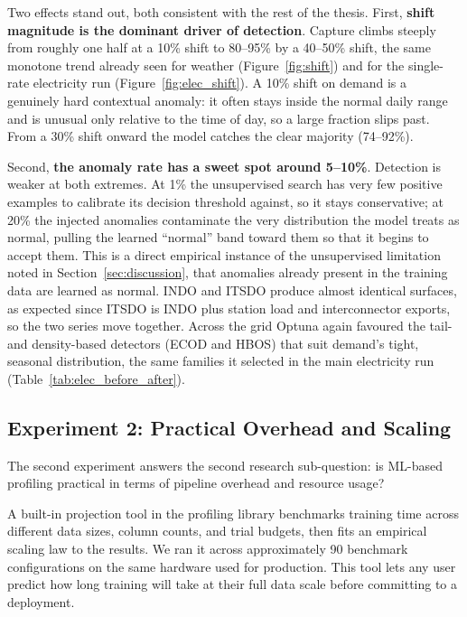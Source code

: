 \documentclass[12pt]{article}
\begin{document}
Two effects stand out, both consistent with the rest of the thesis. First, \textbf{shift magnitude is the dominant driver of detection}. Capture climbs steeply from roughly one half at a 10\% shift to 80--95\% by a 40--50\% shift, the same monotone trend already seen for weather (Figure~\ref{fig:shift}) and for the single-rate electricity run (Figure~\ref{fig:elec_shift}). A 10\% shift on demand is a genuinely hard contextual anomaly: it often stays inside the normal daily range and is unusual only relative to the time of day, so a large fraction slips past. From a 30\% shift onward the model catches the clear majority (74--92\%).

Second, \textbf{the anomaly rate has a sweet spot around 5--10\%}. Detection is weaker at both extremes. At 1\% the unsupervised search has very few positive examples to calibrate its decision threshold against, so it stays conservative; at 20\% the injected anomalies contaminate the very distribution the model treats as normal, pulling the learned ``normal'' band toward them so that it begins to accept them. This is a direct empirical instance of the unsupervised limitation noted in Section~\ref{sec:discussion}, that anomalies already present in the training data are learned as normal. INDO and ITSDO produce almost identical surfaces, as expected since ITSDO is INDO plus station load and interconnector exports, so the two series move together. Across the grid Optuna again favoured the tail- and density-based detectors (ECOD and HBOS) that suit demand's tight, seasonal distribution, the same families it selected in the main electricity run (Table~\ref{tab:elec_before_after}).

\subsection{Experiment 2: Practical Overhead and Scaling}

The second experiment answers the second research sub-question: is ML-based profiling practical in terms of pipeline overhead and resource usage?

A built-in projection tool in the profiling library benchmarks training time across different data sizes, column counts, and trial budgets, then fits an empirical scaling law to the results. We ran it across approximately 90 benchmark configurations on the same hardware used for production. This tool lets any user predict how long training will take at their full data scale before committing to a deployment.
\end{document}
